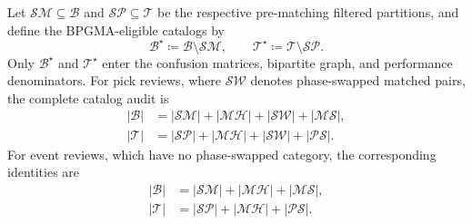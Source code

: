 Let $\mathcal{SM} \subseteq \mathcal{B}$ and
$\mathcal{SP} \subseteq \mathcal{T}$ be the respective pre-matching
filtered partitions, and define the \acs{BPGMA}-eligible catalogs by
\begin{equation}
  \mathcal{B}^{\star} \coloneqq \mathcal{B} \setminus \mathcal{SM}, \qquad
  \mathcal{T}^{\star} \coloneqq \mathcal{T} \setminus \mathcal{SP}.
\end{equation}
Only $\mathcal{B}^{\star}$ and $\mathcal{T}^{\star}$ enter the
confusion matrices, bipartite graph, and performance denominators.
For pick reviews, where $\mathcal{SW}$ denotes phase-swapped matched
pairs, the complete catalog audit is
\begin{align}
  |\mathcal{B}| & = |\mathcal{SM}| + |\mathcal{MH}| +
  |\mathcal{SW}| + |\mathcal{MS}|, \\
  |\mathcal{T}| & = |\mathcal{SP}| + |\mathcal{MH}| +
  |\mathcal{SW}| + |\mathcal{PS}|.
\end{align}
For event reviews, which have no phase-swapped category, the
corresponding identities are
\begin{align}
  |\mathcal{B}| & = |\mathcal{SM}| + |\mathcal{MH}| +
  |\mathcal{MS}|, \\
  |\mathcal{T}| & = |\mathcal{SP}| + |\mathcal{MH}| +
  |\mathcal{PS}|.
\end{align}

